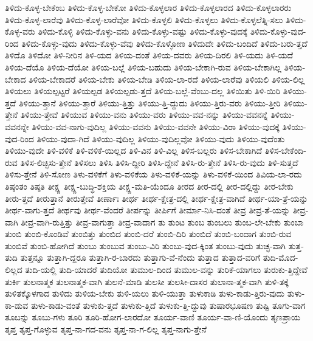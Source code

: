 {ತಿಳಿದು-ಕೊಳ್ಳ-ಬೇಕೆಂಬ
ತಿಳಿದು-ಕೊಳ್ಳ-ಬೇಕೋ
ತಿಳಿದು-ಕೊಳ್ಳಲಾರ
ತಿಳಿದು-ಕೊಳ್ಳಲಾರದ
ತಿಳಿದು-ಕೊಳ್ಳಲಾರರು
ತಿಳಿದು-ಕೊಳ್ಳ-ಲಾರೆವು
ತಿಳಿದು-ಕೊಳ್ಳ-ಲಾರೆವೋ
ತಿಳಿದು-ಕೊಳ್ಳಲಿ
ತಿಳಿದು-ಕೊಳ್ಳಲು
ತಿಳಿದು-ಕೊಳ್ಳಲೆತ್ನಿ-ಸಲು
ತಿಳಿದು-ಕೊಳ್ಳ-ವರು
ತಿಳಿದು-ಕೊಳ್ಳಿ
ತಿಳಿದು-ಕೊಳ್ಳು-ವನು
ತಿಳಿದು-ಕೊಳ್ಳು-ವಷ್ಟು
ತಿಳಿದು-ಕೊಳ್ಳು-ವುದಕ್ಕೆ
ತಿಳಿದು-ಕೊಳ್ಳು-ವುದ-ರಿಂದ
ತಿಳಿದು-ಕೊಳ್ಳು-ವುದು
ತಿಳಿದು-ಕೊಳ್ಳು-ವೆವು
ತಿಳಿದು-ಕೊಳ್ಳೋಣ
ತಿಳಿದುದೇ
ತಿಳಿದು-ಬಂದಿದೆ
ತಿಳಿದು-ಬರು-ತ್ತದೆ
ತಿಳಿದೊ
ತಿಳಿದೋ
ತಿಳಿ-ನೀರಿನ
ತಿಳಿ-ಯದ
ತಿಳಿಯ-ದಂತೆ
ತಿಳಿಯ-ದವರು
ತಿಳಿಯ-ದಿರಲಿ
ತಿಳಿ-ಯದು
ತಿಳಿ-ಯದೆ
ತಿಳಿಯ-ದೆಯೊ
ತಿಳಿಯ-ದೆಯೋ
ತಿಳಿಯ-ಬಲ್ಲೆ
ತಿಳಿಯ-ಬಹುದು
ತಿಳಿಯ-ಬೇಕಾಗಿ-ರುವ
ತಿಳಿಯ-ಬೇಕಾಗಿಲ್ಲ
ತಿಳಿಯ-ಬೇಕಾದ
ತಿಳಿಯ-ಬೇಕಾದರೆ
ತಿಳಿಯ-ಬೇಕು
ತಿಳಿಯ-ಬೇಡಿ
ತಿಳಿಯ-ಲಾ-ರದೆ
ತಿಳಿಯ-ಲಾರೆವು
ತಿಳಿಯಲಿ
ತಿಳಿಯ-ಲಿಲ್ಲ
ತಿಳಿಯಲು
ತಿಳಿಯಲ್ಪಟ್ಟರೆ
ತಿಳಿಯಲ್ಪಡ
ತಿಳಿಯಲ್ಪಡು-ತ್ತದೆ
ತಿಳಿಯ-ಬಲ್ಲೆ-ವೆಂಬು-ದಲ್ಲ
ತಿಳಿಯಿತು
ತಿಳಿ-ಯಿರಿ
ತಿಳಿಯು-ತ್ತದೆ
ತಿಳಿಯು-ತ್ತಾನೆ
ತಿಳಿಯು-ತ್ತಾರೆ
ತಿಳಿಯು-ತ್ತಿತ್ತು
ತಿಳಿಯು-ತ್ತಿ-ದ್ದುದು
ತಿಳಿಯು-ತ್ತಿರು-ವರು
ತಿಳಿಯು-ತ್ತೀರಿ
ತಿಳಿಯು-ತ್ತೇನೆ
ತಿಳಿಯು-ತ್ತೇವೆ
ತಿಳಿಯುವ
ತಿಳಿಯು-ವನು
ತಿಳಿಯು-ವರು
ತಿಳಿಯು-ವವ-ನನ್ನು
ತಿಳಿಯು-ವವನನ್ನೆ
ತಿಳಿಯು-ವವನನ್ನೇ
ತಿಳಿಯು-ವವ-ನಾಗು-ವುದಿಲ್ಲ
ತಿಳಿಯು-ವವನು
ತಿಳಿಯು-ವವನೇ
ತಿಳಿಯು-ವಿರಾ
ತಿಳಿಯು-ವುದಕ್ಕೆ
ತಿಳಿಯು-ವುದ-ರಿಂದ
ತಿಳಿಯು-ವುದಾ-ಗಿದೆ
ತಿಳಿಯು-ವುದಿಲ್ಲ
ತಿಳಿಯು-ವುದಿಲ್ಲವೋ
ತಿಳಿಯು-ವುದು
ತಿಳಿಯು-ವುದೆಂತು
ತಿಳಿಯು-ವುದೇ
ತಿಳಿ-ವಳಿಕೆ
ತಿಳಿ-ವಳಿಕೆ-ಯಿಲ್ಲದ
ತಿಳಿ-ವಿನ
ತಿಳಿ-ವಿಲ್ಲ
ತಿಳಿಸ-ಬಲ್ಲರು
ತಿಳಿಸ-ಬೇಕಾಗಿದೆ
ತಿಳಿಸ-ಬೇಕೆಂದಿ-ರುವ
ತಿಳಿಸ-ಲಿಚ್ಛಿಸು-ತ್ತೇನೆ
ತಿಳಿಸಲು
ತಿಳಿಸಿ
ತಿಳಿಸಿ-ದ್ದೀರಿ
ತಿಳಿಸಿ-ದ್ದೇನೆ
ತಿಳಿಸಿ-ರು-ತ್ತೇನೆ
ತಿಳಿಸಿ-ರು-ವುದು
ತಿಳಿ-ಸುತ್ತದೆ
ತಿಳಿಸು-ತ್ತೇನೆ
ತಿಳಿ-ಸೋಣ
ತಿಳು-ವಳಿಕೆಗೆ
ತಿಳು-ವಳಿಕೆಯ
ತಿಳು-ವಳಿಕೆ-ಯನ್ನು
ತಿಳು-ವಳಿಕೆ-ಯಿಂದ
ತಿವಿಯ-ಲಾ-ರದು
ತಿಷ್ಠಂತಂ
ತಿಷ್ಠತಿ
ತೀಕ್ಷ್ಣ
ತೀಕ್ಷ್ಣ-ಬುದ್ಧಿ-ಶಕ್ತಿಯ
ತೀಕ್ಷ್ಣ-ಮತಿ-ಯೆಂದೂ
ತೀರದ
ತೀರ-ದಲ್ಲಿ
ತೀರ-ದಲ್ಲಿದ್ದು
ತೀರ-ಬೇಕು
ತೀರು-ತ್ತದೆ
ತೀರುತ್ತಾನೆ
ತೀರುತ್ತೇವೆ
ತೀರ್ಣಾಃ
ತೀರ್ಥ
ತೀರ್ಥ-ಕ್ಷೇತ್ರ-ದಲ್ಲಿ
ತೀರ್ಥ-ಕ್ಷೇತ್ರ-ವಾಗಿದೆ
ತೀರ್ಥ-ಯಾ-ತ್ರೆ-ಯನ್ನು
ತೀರ್ಥ-ವಾಗು-ತ್ತದೆ
ತೀರ್ಥವು
ತೀರ್ಥ-ವೆಂದರೆ
ತೀರ್ಪನ್ನು
ತೀರ್ಪಿಗೆ
ತೀರ್ಮಾ-ನಿಸಿ-ದಂತೆ
ತೀವ್ರ
ತೀವ್ರ-ತೆ-ಯನ್ನು
ತೀವ್ರ-ವಾಗಿ
ತೀವ್ರ-ವಾಗಿ-ರುತ್ತಿತ್ತು
ತೀವ್ರ-ವಾಗುತ್ತಾ
ತೀವ್ರ-ವಾದಾಗ
ತು
ತುಂಟ
ತುಂಬ
ತುಂಬಲು
ತುಂಬ-ಲೇ-ಬೇಕು
ತುಂಬಾ
ತುಂಬಿ
ತುಂಬಿ-ಕೊಂಡಿವೆ
ತುಂಬಿತ್ತು
ತುಂಬಿದ
ತುಂಬಿ-ದರೆ
ತುಂಬಿ-ದಿರಿ
ತುಂಬಿದೆ
ತುಂಬಿ-ಬಂದಾಗ
ತುಂಬಿ-ರುವ
ತುಂಬಿವೆ
ತುಂಬಿ-ಹೋಗಿದೆ
ತುಂಬು
ತುಂಬುವ
ತುಂಬು-ವಿರಿ
ತುಂಬು-ವುದ-ಕ್ಕಿಂತ
ತುಂಬು-ವುದು
ತುಚ್ಛ-ವಾಗಿ
ತುತ್ತ-ತುದಿ
ತುತ್ತನ್ನೂ
ತುತ್ತಾಗಿ-ದ್ದರೂ
ತುತ್ತಾಗಿ-ರ-ಬಾರದು
ತುತ್ತಾಗು-ವೆ-ನೆಂದು
ತುತ್ತಾದ
ತುತ್ತಾದ-ವರಿಗೆ
ತುದಿ-ಮೊದ-ಲಿಲ್ಲದ
ತುದಿ-ಯಲ್ಲಿ
ತುದಿ-ಯಾದರೆ
ತುದಿಯೋ
ತುಮುಲ-ದಿಂದ
ತುಮುಲ-ವನ್ನು
ತುರಿಕೆ-ಯಾಗಲು
ತುರುಕು-ತ್ತಿದ್ದೇವೆ
ತುರ್ಕಿ
ತುಲನಾತ್ಮಕ
ತುಲನಾತ್ಮಕ-ವಾಗಿ
ತುಲನೆ-ಮಾಡಿ
ತುಲಸೀ
ತುಲಸೀ-ದಾಸರ
ತುಲಾನಾ-ತ್ಮಕ-ವಾಗಿ
ತುಳಿ-ತಕ್ಕೆ
ತುಳಿತಕ್ಕೊಳಗಾದ
ತುಳಿದು
ತುಳಿಯ-ಬೇಕು
ತುಳಿ-ಯಲು
ತುಳಿ-ಯುತ್ತಾ
ತುಳುಕಾಡಿ
ತುಳು-ಕಾಡು-ತ್ತಿರು-ವುದು
ತುಳು-ಕಾ-ಡುವ
ತುಳು-ಕಾಡು-ವಂತೆ
ತುಳುಕು-ತ್ತದೆ
ತುಳುಕು-ತ್ತಿದೆ
ತುಳುಕು-ತ್ತಿ-ದ್ದುವು
ತುಷಾರಭೂಷಣ
ತುಷ್ಟಿ
ತೂಗು-ವಾಗ
ತೂಬನ್ನು
ತೂಬು-ಗಳು
ತೂರಿ
ತೂರಿ-ಹೋಗ-ಲಾರದೋ
ತೂರ್ಯ-ವಾಣಿ
ತೂರ್ಯ-ವಾ-ಣಿ-ಯೊಂದು
ತೃಣಪ್ರಾಯ
ತೃಪ್ತ
ತೃಪ್ತ-ಗೊಳ್ಳುವ
ತೃಪ್ತ-ನಾ-ಗದ-ವನು
ತೃಪ್ತ-ನಾ-ಗ-ಲಿಲ್ಲ
ತೃಪ್ತ-ನಾಗು-ತ್ತೇನೆ
}
